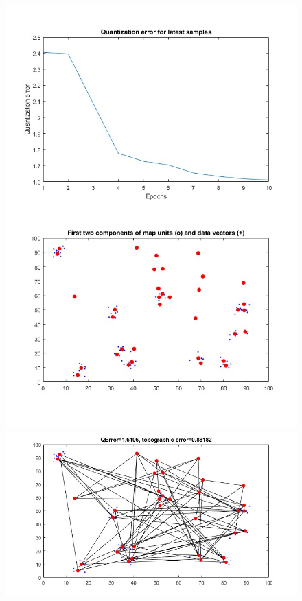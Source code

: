 \documentclass[11pt]{article}
\begin{document}
\begin{figure}[h!]
  \includegraphics{screeny/CWTA/CWTA_10_groups/CWTA_learning_process.jpg}
  \includegraphics{screeny/CWTA/CWTA_10_groups/CWTA_Graph.jpg}

\end{figure}
\end{document}
